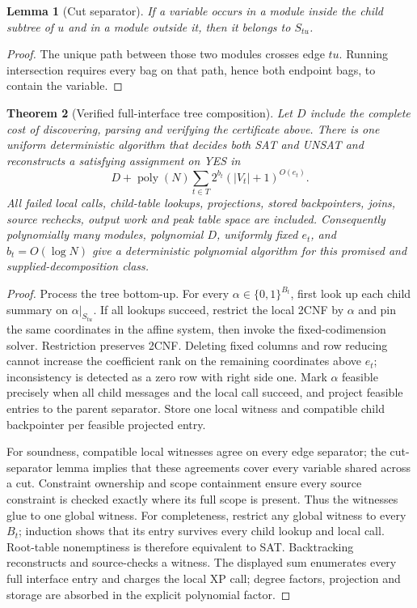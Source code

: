 \documentclass[11pt]{article}
\newtheorem{theorem}{Theorem}
\newtheorem{lemma}[theorem]{Lemma}
\begin{document}
\begin{lemma}[Cut separator]
If a variable occurs in a module inside the child subtree of $u$ and in a
module outside it, then it belongs to $S_{tu}$.
\end{lemma}
\begin{proof}
The unique path between those two modules crosses edge $tu$.  Running
intersection requires every bag on that path, hence both endpoint bags, to
contain the variable.
\end{proof}

\begin{theorem}[Verified full-interface tree composition]
Let $D$ include the complete cost of discovering, parsing and verifying the
certificate above.  There is one uniform deterministic algorithm that decides
both SAT and UNSAT and reconstructs a satisfying assignment on YES in
\[
 D+\operatorname{poly}(N)\sum_{t\in T}
     2^{b_t} (|V_t|+1)^{O(e_t)} .
\]
All failed local calls, child-table lookups, projections, stored backpointers,
joins, source rechecks, output work and peak table space are included.
Consequently polynomially many modules, polynomial $D$, uniformly fixed
$e_t$, and $b_t=O(\log N)$ give a deterministic polynomial algorithm for this
promised and supplied-decomposition class.
\end{theorem}
\begin{proof}
Process the tree bottom-up.  For every $\alpha\in\{0,1\}^{B_t}$, first look up
each child summary on $\alpha|_{S_{tu}}$.  If all lookups succeed, restrict the
local 2CNF by $\alpha$ and pin the same coordinates in the affine system, then
invoke the fixed-codimension solver.  Restriction preserves 2CNF.  Deleting
fixed columns and row reducing cannot increase the coefficient rank on the
remaining coordinates above $e_t$; inconsistency is detected as a zero row
with right side one.  Mark $\alpha$ feasible precisely when all child messages
and the local call succeed, and project feasible entries to the parent
separator.  Store one local witness and compatible child backpointer per
feasible projected entry.

For soundness, compatible local witnesses agree on every edge separator;
the cut-separator lemma implies that these agreements cover every variable
shared across a cut.  Constraint ownership and scope containment ensure every
source constraint is checked exactly where its full scope is present.  Thus
the witnesses glue to one global witness.  For completeness, restrict any
global witness to every $B_t$; induction shows that its entry survives every
child lookup and local call.  Root-table nonemptiness is therefore equivalent
to SAT.  Backtracking reconstructs and source-checks a witness.  The displayed
sum enumerates every full interface entry and charges the local XP call;
degree factors, projection and storage are absorbed in the explicit
polynomial factor.
\end{proof}
\end{document}
